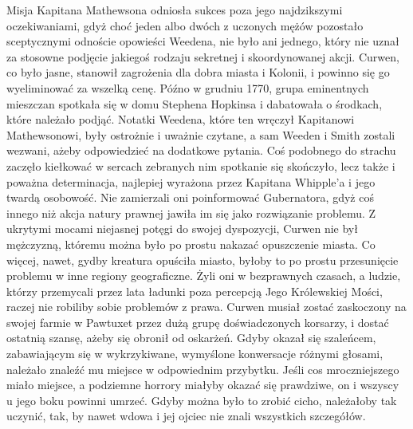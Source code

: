 Misja Kapitana Mathewsona odniosła sukces poza jego najdzikszymi oczekiwaniami, gdyż choć jeden albo dwóch z uczonych mężów pozostało sceptycznymi odnoście opowieści Weedena, nie było ani jednego, który nie uznał za stosowne podjęcie jakiegoś rodzaju sekretnej i skoordynowanej akcji. Curwen, co było jasne, stanowił zagrożenia dla dobra miasta i Kolonii, i powinno się go wyeliminować za wszelką cenę. Późno w grudniu 1770, grupa eminentnych mieszczan spotkała się w domu Stephena Hopkinsa i dabatowała o środkach, które należało podjąć. Notatki Weedena, które ten wręczył Kapitanowi Mathewsonowi, były ostrożnie i uważnie czytane, a sam Weeden i Smith zostali wezwani, ażeby odpowiedzieć na dodatkowe pytania. Coś podobnego do strachu zaczęło kiełkować w sercach zebranych nim spotkanie się skończyło, lecz także i poważna determinacja, najlepiej wyrażona przez Kapitana Whipple'a i jego twardą osobowość. Nie zamierzali oni poinformować Gubernatora, gdyż coś innego niż akcja natury prawnej jawiła im się jako rozwiązanie problemu. Z ukrytymi mocami niejasnej potęgi do swojej dyspozycji, Curwen nie był mężczyzną, któremu można było po prostu nakazać opuszczenie miasta. Co więcej, nawet, gydby kreatura opuściła miasto, byłoby to po prostu przesunięcie problemu w inne regiony geograficzne. Żyli oni w bezprawnych czasach, a ludzie, którzy przemycali przez lata ładunki poza percepcją Jego Królewskiej Mości, raczej nie robiliby sobie problemów z prawa. Curwen musiał zostać zaskoczony na swojej farmie w Pawtuxet przez dużą grupę doświadczonych korsarzy, i dostać ostatnią szansę, ażeby się obronił od oskarżeń. Gdyby okazał się szaleńcem, zabawiającym się w wykrzykiwane, wymyślone konwersacje różnymi głosami, należało znaleźć mu miejsce w odpowiednim przybytku. Jeśli cos mroczniejszego miało miejsce, a podziemne horrory miałyby okazać się prawdziwe, on i wszyscy u jego boku powinni umrzeć. Gdyby można było to zrobić cicho, należałoby tak uczynić, tak, by nawet wdowa i jej ojciec nie znali wszystkich szczegółów. 

